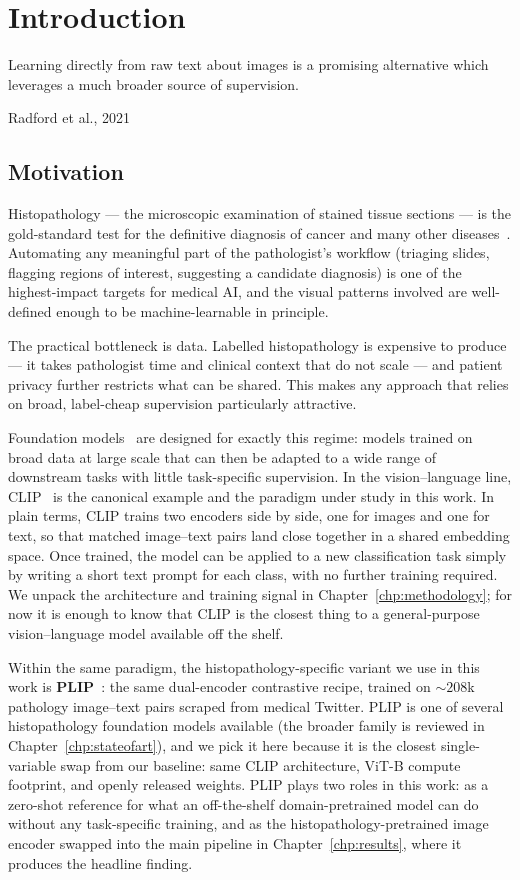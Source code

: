 \chapter{Introduction}\label{chp:introduction}
\epigraph{Learning directly from raw text about images is a promising alternative which leverages a much broader source of supervision.}{Radford et al., 2021}

\section{Motivation}
\label{sec:intro-motivation}

Histopathology --- the microscopic examination of stained tissue sections --- is the gold-standard test for the definitive diagnosis of cancer and many other diseases~\cite{vanderlaak2021deeplearning}. Automating any meaningful part of the pathologist's workflow (triaging slides, flagging regions of interest, suggesting a candidate diagnosis) is one of the highest-impact targets for medical AI, and the visual patterns involved are well-defined enough to be machine-learnable in principle.

The practical bottleneck is data. Labelled histopathology is expensive to produce --- it takes pathologist time and clinical context that do not scale --- and patient privacy further restricts what can be shared. This makes any approach that relies on broad, label-cheap supervision particularly attractive.

Foundation models~\cite{bommasani2021foundation} are designed for exactly this regime: models trained on broad data at large scale that can then be adapted to a wide range of downstream tasks with little task-specific supervision. In the vision--language line, CLIP~\cite{radford2021clip} is the canonical example and the paradigm under study in this work. In plain terms, CLIP trains two encoders side by side, one for images and one for text, so that matched image--text pairs land close together in a shared embedding space. Once trained, the model can be applied to a new classification task simply by writing a short text prompt for each class, with no further training required. We unpack the architecture and training signal in Chapter~\ref{chp:methodology}; for now it is enough to know that CLIP is the closest thing to a general-purpose vision--language model available off the shelf.

Within the same paradigm, the histopathology-specific variant we use in this work is \textbf{PLIP}~\cite{huang2023plip}: the same dual-encoder contrastive recipe, trained on $\sim 208$k pathology image--text pairs scraped from medical Twitter. PLIP is one of several histopathology foundation models available (the broader family is reviewed in Chapter~\ref{chp:stateofart}), and we pick it here because it is the closest single-variable swap from our baseline: same CLIP architecture, ViT-B compute footprint, and openly released weights. PLIP plays two roles in this work: as a zero-shot reference for what an off-the-shelf domain-pretrained model can do without any task-specific training, and as the histopathology-pretrained image encoder swapped into the main pipeline in Chapter~\ref{chp:results}, where it produces the headline finding.

